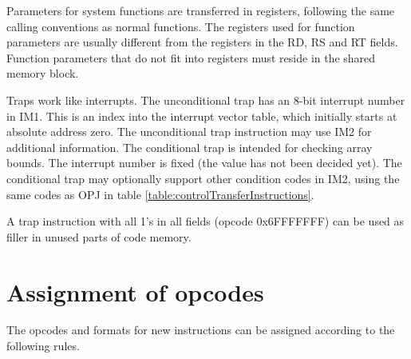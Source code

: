 \documentclass[forwardcom.tex]{subfiles}
\begin{document}
Parameters for system functions are transferred in registers, following the same calling conventions as normal functions. The registers used for function parameters are usually different from the registers in the RD, RS and RT fields. Function parameters that do not fit into registers must reside in the shared memory block.
\vspace{2mm}

\label{traps}
Traps work like interrupts. The unconditional trap has an 8-bit interrupt number in IM1. This is an index into the interrupt vector table, which initially starts at absolute address zero. The unconditional trap instruction may use IM2 for additional information. The conditional trap is intended for checking array bounds. The interrupt number is fixed (the value has not been decided yet). The conditional trap may optionally support other condition codes in IM2, using the same codes as OPJ in table \ref{table:controlTransferInstructions}.
\vspace{2mm}

A trap instruction with all 1's in all fields (opcode 0x6FFFFFFF) can be used as filler in unused parts of code memory.

\section{Assignment of opcodes}
The opcodes and formats for new instructions can be assigned according to the following rules.
\end{document}
